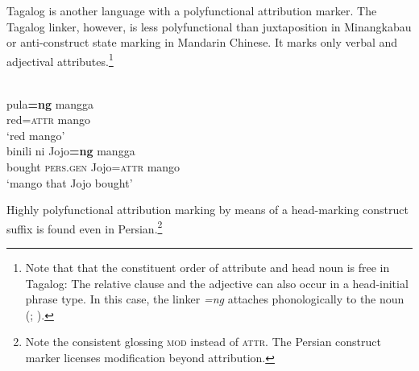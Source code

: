 Tagalog is another language with a polyfunctional attribution marker. The Tagalog linker, however, is less polyfunctional than juxtaposition in Minangkabau or anti-construct state marking in Mandarin Chinese. It marks only verbal and adjectival attributes.\footnote{Note that that the constituent order of attribute and head noun is free in Tagalog: The relative clause and the adjective can also occur in a head-initial phrase type. In this case, the linker \textit{=ng} attaches phonologically to the noun (\citealt[1]{gil2005}; \citealt[160, 162]{himmelmann1997}).}
\begin{exe}
\ex 
{} \label{multi tagalog}
\begin{xlist}
\\
\gll	pula\textbf{=ng} mangga\\
	red{=\textsc{attr}} mango\\
\glt	‘red mango’
\\
\gll	binili ni Jojo\textbf{=ng} mangga\\
	bought \textsc{pers.gen} Jojo{=\textsc{attr}} mango\\
\glt	‘mango that Jojo bought’
\end{xlist}
\end{exe}
Highly polyfunctional attribution marking by means of a head-marking construct suffix is found even in Persian.\footnote{Note the consistent glossing \textsc{mod} instead of \textsc{attr}. The Persian construct marker licenses modification beyond attribution.}

